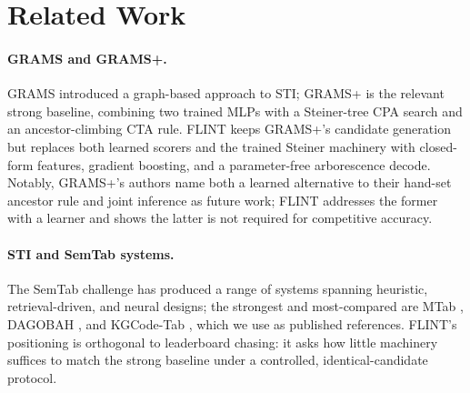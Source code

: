 \documentclass[11pt]{article}
\begin{document}

\section{Related Work}
\label{sec:related}

\paragraph{GRAMS and GRAMS+.} GRAMS \cite{vu2021grams} introduced a graph-based
approach to STI; GRAMS+ \cite{vu2024gramsplus} is the relevant strong baseline,
combining two trained MLPs with a Steiner-tree CPA search and an ancestor-climbing
CTA rule. FLINT keeps GRAMS+'s candidate generation but replaces both learned
scorers and the trained Steiner machinery with closed-form features, gradient
boosting, and a parameter-free arborescence decode. Notably, GRAMS+'s authors name
both a learned alternative to their hand-set ancestor rule and joint inference as
future work; FLINT addresses the former with a learner and shows the latter is not
required for competitive accuracy.

\paragraph{STI and SemTab systems.} The SemTab challenge \cite{semtab} has produced
a range of systems \cite{stisurvey} spanning heuristic, retrieval-driven, and neural
designs; the strongest and most-compared are MTab \cite{mtab}, DAGOBAH \cite{dagobah},
and KGCode-Tab \cite{kgcodetab}, which we use as published references. FLINT's
positioning is orthogonal
to leaderboard chasing: it asks how little machinery suffices to match the strong
baseline under a controlled, identical-candidate protocol.
\end{document}

